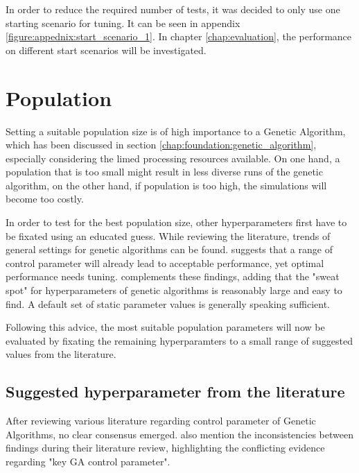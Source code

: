 In order to reduce the required number of tests, it was decided to only use one starting scenario for tuning. It can be seen in appendix \ref{figure:appednix:start_scenario_1}. In chapter \ref{chap:evaluation}, the performance on different start scenarios will be investigated.


\section{Population}
\label{chap:hyperparameter_tuning:population}
Setting a suitable population size is of high importance to a Genetic Algorithm, which has been discussed in section \ref{chap:foundation:genetic_algorithm}, especially considering the limed processing resources available. On one hand, a population that is too small might result in less diverse runs of the genetic algorithm, on the other hand, if population is too high, the simulations will become too costly.

In order to test for the best population size, other hyperparameters first have to be fixated using an educated guess. While reviewing the literature, trends of general settings for genetic algorithms can be found. 
\cite{grefenstette_optimization_1986} suggests that a range of control parameter will already lead to acceptable performance, yet optimal performance needs tuning. \cite{kacprzyk_parameter_2007} complements these findings, adding that the "sweat spot" for hyperparameters of genetic algorithms is reasonably large and easy to find. A default set of static parameter values is generally speaking sufficient.

Following this advice, the most suitable population parameters will now be evaluated by fixating the remaining hyperparamters to a small range of suggested values from the literature.

\subsection{Suggested hyperparameter from the literature}

After reviewing various literature regarding control parameter of Genetic Algorithms, no clear consensus emerged. \cite{mills_determining_2015} also mention the inconsistencies between findings during their literature review, highlighting the conflicting evidence regarding "key GA control parameter".

